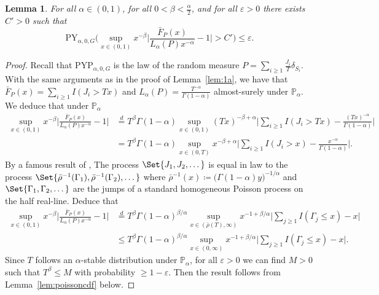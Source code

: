 \documentclass{article}
\newtheorem{lemma}{Lemma}
\newcommand{\1}{\boldsymbol{1}}
\newcommand{\PP}{\mathbb{P}}
\theoremstyle{plain}
\begin{document}
\begin{lemma}
  \label{lem:1b}
  For all $\alpha \in (0,1)$, for all $0 < \beta < \frac{\alpha}{2}$, and for all $\varepsilon > 0$ there exists $C' > 0$ such that
  \begin{equation*}
    \mathrm{PY}_{\alpha,0,G}\Big(\sup_{x\in (0,1)}x^{-\beta}\Big| \frac{\bar{F}_P(x)}{L_{\alpha}(P)x^{-\alpha}} -1\Big| > C' \Big) \leq \varepsilon.
  \end{equation*}
\end{lemma}
\begin{proof}
  Recall that $\mathrm{PYP}_{\alpha,0,G}$ is the law of the random measure $P = \sum_{i\geq 1}\frac{J_i}{T}\delta_{S_i}$.
  With the same arguments as in the proof of Lemma~\ref{lem:1a}, we have that $\bar{F}_P(x) = \sum_{i\geq 1}I(J_i > Tx)$ and $L_{\alpha}(P) = \frac{T^{-\alpha}}{\Gamma(1-\alpha)}$ almost-surely under $\PP_{\alpha}$. We deduce that under $\PP_{\alpha}$
  \begin{align*}
    \sup_{x\in (0,1)}x^{-\beta}\Big| \frac{\bar{F}_P(x)}{L_{\alpha}(P)x^{-\alpha}} -1\Big|
    &\overset{d}{=} T^{\beta} \Gamma(1-\alpha)\sup_{x\in (0,1)} (Tx)^{-\beta + \alpha}\Big|\sum_{i\geq 1}I(J_i > Tx) - \frac{(Tx)^{-\alpha}}{\Gamma(1-\alpha)}  \Big|\\
    &= T^{\beta} \Gamma(1-\alpha)\sup_{x\in (0,T)} x^{-\beta + \alpha}\Big|\sum_{i\geq 1}I(J_i > x) - \frac{x^{-\alpha}}{\Gamma(1-\alpha)}  \Big|.
  \end{align*}
  By a famous result of \cite{Fer(72)}, The process $\Set{J_1,J_2,\dots}$ is equal in law to the process $\Set{\bar{\rho}^{-1}(\Gamma_1),\bar{\rho}^{-1}(\Gamma_2),\dots}$ where $\bar{\rho}^{-1}(x) \coloneqq \big( \Gamma(1-\alpha)y \big)^{-1/\alpha}$ and $\Set{\Gamma_1,\Gamma_2,\dots}$ are the jumps of a standard homogeneous Poisson process on the half real-line. Deduce that
  \begin{align*}
    \sup_{x\in (0,1)}x^{-\beta}\Big| \frac{\bar{F}_P(x)}{L_{\alpha}(P)x^{-\alpha}} -1\Big|
    &\overset{d}{=} T^{\beta}\Gamma(1-\alpha)^{\beta/\alpha} \sup_{x\in (\bar{\rho}(T),\infty)} x^{-1 + \beta/\alpha}\Big| \sum_{j\geq 1}I(\Gamma_j \leq x) - x\Big|\\
    &\leq T^{\beta}\Gamma(1-\alpha)^{\beta/\alpha} \sup_{x\in (0,\infty)} x^{-1 + \beta/\alpha}\Big| \sum_{j\geq 1}I(\Gamma_j \leq x) - x\Big|.
  \end{align*}
  Since $T$ follows an $\alpha$-stable distribution under $\PP_{\alpha}$, for all $\varepsilon > 0$ we can find $M > 0$ such that $T^{\beta} \leq M$ with probability $\geq 1 - \varepsilon$. Then the result follows from Lemma~\ref{lem:poissoncdf} below.
 \end{proof}
\end{document}
